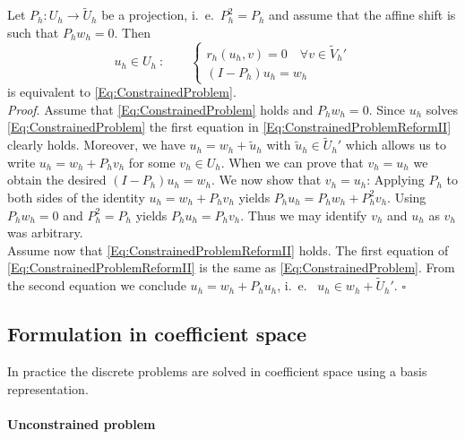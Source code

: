 \begin{lemma}
 Let $P_h : U_h \to \tilde{U}_h$ be a projection,
i.~e.~$P_h^2 = P_h$ and assume that the affine shift is such that 
$P_h w_h = 0$. Then 
\begin{equation}\label{Eq:ConstrainedProblemReformII}
u_h\in U_h\ : \qquad \left\{\begin{array}{ll}
r_h(u_h,v) = 0 \quad \forall v\in \tilde{V}_h'\\
(I-P_h)u_h = w_h
\end{array}\right. 
\end{equation}
is equivalent to \eqref{Eq:ConstrainedProblem}.\\
\textit{Proof}. Assume that \eqref{Eq:ConstrainedProblem} holds and
$P_h w_h = 0$. Since $u_h$ solves \eqref{Eq:ConstrainedProblem}
the first equation in \eqref{Eq:ConstrainedProblemReformII} clearly holds.
Moreover, we have $u_h = w_h + \tilde{u}_h$ with $\tilde{u}_h\in
\tilde{U}_h'$ which allows us to write $u_h = w_h + P_h v_h$ for some
$v_h\in U_h$. When we can prove that $v_h=u_h$ we obtain the desired
$(I-P_h)u_h = w_h$. We now show that $v_h=u_h$:
Applying $P_h$ to both sides of the identity $u_h = w_h + P_h v_h$ yields
$P_h u_h = P_h w_h + P_h^2 v_h$. Using $P_h w_h = 0$ and $P_h^2 = P_h$
yields $P_h u_h = P_h v_h$. Thus we may identify $v_h$ and $u_h$ as
$v_h$ was arbitrary.\\
Assume now that \eqref{Eq:ConstrainedProblemReformII} holds. The first
equation of \eqref{Eq:ConstrainedProblemReformII} is the same as 
\eqref{Eq:ConstrainedProblem}. From the
second equation we conclude $u_h = w_h + P_h u_h$, i.~e.~ $u_h\in w_h
+ \tilde{U}_h'$. \hfill$\square$
\end{lemma}

\subsection{Formulation in coefficient space}

In practice the discrete problems are solved in coefficient space
using a basis representation. 

\paragraph{Unconstrained problem}

